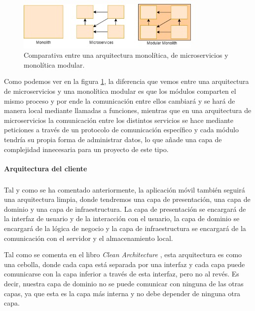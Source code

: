 \begin{figure}[H]
  \centering
  \includegraphics[width=0.8\textwidth]{assets/modular-monolith-comparison.png}
  \caption{Comparativa entre una arquitectura monolítica, de microservicios y monolítica modular. \parencite{tsechelidis2023modular}}
  \label{fig:modular-monolith-comparison}
\end{figure}

Como podemos ver en la figura \ref{fig:modular-monolith-comparison}, la diferencia que vemos entre una arquitectura de microservicios y una monolítica modular es que los módulos comparten el mismo proceso y por ende la comunicación entre ellos cambiará y se hará de manera local mediante llamadas a funciones, mientras que en una arquitectura de microservicios la comunicación entre los distintos servicios se hace mediante peticiones a través de un protocolo de comunicación específico y cada módulo tendría su propia forma de administrar datos, lo que añade una capa de complejidad innecesaria para un proyecto de este tipo.

\paragraph{Arquitectura del cliente}
\subparagraph{}
Tal y como se ha comentado anteriormente, la aplicación móvil también seguirá una arquitectura limpia, donde tendremos una capa de presentación, una capa de dominio y una capa de infraestructura.
La capa de presentación se encargará de la interfaz de usuario y de la interacción con el usuario, la capa de dominio se encargará de la lógica de negocio y la capa de infraestructura se encargará de la comunicación con el servidor y el almacenamiento local.

Tal como se comenta en el libro \textit{Clean Architecture} \parencite{uncle-bob-clean-architecture}, esta arquitectura es como una cebolla, donde cada capa está separada por una interfaz y cada capa puede comunicarse con la capa inferior a través de esta interfaz, pero no al revés.
Es decir, nuestra capa de dominio no se puede comunicar con ninguna de las otras capas, ya que esta es la capa más interna y no debe depender de ninguna otra capa.


